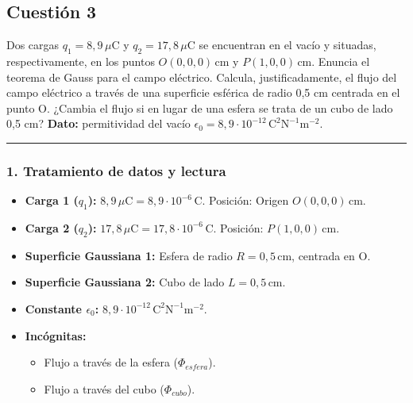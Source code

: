 \newpage

\subsection{Cuestión 3}
\label{subsec:C3_2020_sep_ext}

\begin{cajaenunciado}
Dos cargas $q_1 = 8,9\,\mu\text{C}$ y $q_2 = 17,8\,\mu\text{C}$ se encuentran en el vacío y situadas, respectivamente, en los puntos $O(0,0,0)\,\text{cm}$ y $P(1,0,0)\,\text{cm}$. Enuncia el teorema de Gauss para el campo eléctrico. Calcula, justificadamente, el flujo del campo eléctrico a través de una superficie esférica de radio 0,5 cm centrada en el punto O. ¿Cambia el flujo si en lugar de una esfera se trata de un cubo de lado 0,5 cm?
\textbf{Dato:} permitividad del vacío $\epsilon_0 = 8,9\cdot10^{-12}\,\text{C}^2\text{N}^{-1}\text{m}^{-2}$.
\end{cajaenunciado}
\hrule

\subsubsection*{1. Tratamiento de datos y lectura}
\begin{itemize}
    \item \textbf{Carga 1 ($q_1$):} $8,9\,\mu\text{C} = 8,9\cdot10^{-6}\,\text{C}$. Posición: Origen $O(0,0,0)\,\text{cm}$.
    \item \textbf{Carga 2 ($q_2$):} $17,8\,\mu\text{C} = 17,8\cdot10^{-6}\,\text{C}$. Posición: $P(1,0,0)\,\text{cm}$.
    \item \textbf{Superficie Gaussiana 1:} Esfera de radio $R = 0,5\,\text{cm}$, centrada en O.
    \item \textbf{Superficie Gaussiana 2:} Cubo de lado $L = 0,5\,\text{cm}$.
    \item \textbf{Constante $\epsilon_0$:} $8,9\cdot10^{-12}\,\text{C}^2\text{N}^{-1}\text{m}^{-2}$.
    \item \textbf{Incógnitas:}
    \begin{itemize}
        \item Flujo a través de la esfera ($\Phi_{esfera}$).
        \item Flujo a través del cubo ($\Phi_{cubo}$).
    \end{itemize}
\end{itemize}

